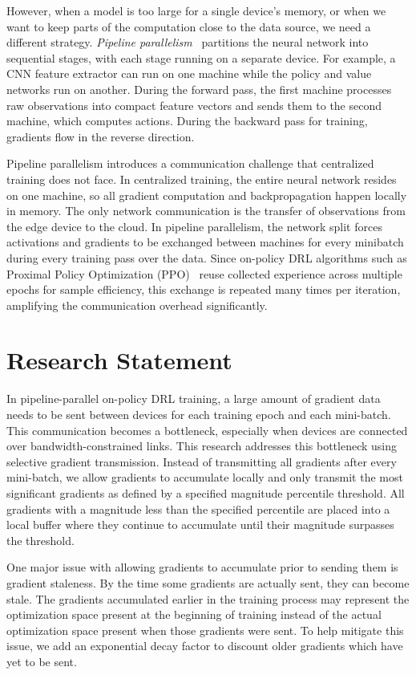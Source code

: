 However, when a model is too large for a single device's memory, or when we want to keep parts of the computation close to the data source, we need a different strategy. \emph{Pipeline parallelism}~\cite{gpipe2019, pipedream2019} partitions the neural network into sequential stages, with each stage running on a separate device. For example, a CNN feature extractor can run on one machine while the policy and value networks run on another. During the forward pass, the first machine processes raw observations into compact feature vectors and sends them to the second machine, which computes actions. During the backward pass for training, gradients flow in the reverse direction.

Pipeline parallelism introduces a communication challenge that centralized training does not face. In centralized training, the entire neural network resides on one machine, so all gradient computation and backpropagation happen locally in memory. The only network communication is the transfer of observations from the edge device to the cloud. In pipeline parallelism, the network split forces activations and gradients to be exchanged between machines for every minibatch during every training pass over the data. Since on-policy DRL algorithms such as Proximal Policy Optimization (PPO)~\cite{ppo2017} reuse collected experience across multiple epochs for sample efficiency, this exchange is repeated many times per iteration, amplifying the communication overhead significantly.

\section{Research Statement}

In pipeline-parallel on-policy DRL training, a large amount of gradient data needs to be sent between devices for each training epoch and each mini-batch. This communication becomes a bottleneck, especially when devices are connected over bandwidth-constrained links.
This research addresses this bottleneck using selective gradient transmission. Instead of transmitting all gradients after every mini-batch, we allow gradients to accumulate locally and only transmit the most significant gradients as defined by a specified magnitude percentile threshold. All gradients with a magnitude less than the specified percentile are placed into a local buffer where they continue to accumulate until their magnitude surpasses the threshold.

One major issue with allowing gradients to accumulate prior to sending them is gradient staleness. By the time some gradients are actually sent, they can become stale. The gradients accumulated earlier in the training process may represent the optimization space present at the beginning of training instead of the actual optimization space present when those gradients were sent. To help mitigate this issue, we add an exponential decay factor to discount older gradients which have yet to be sent.

